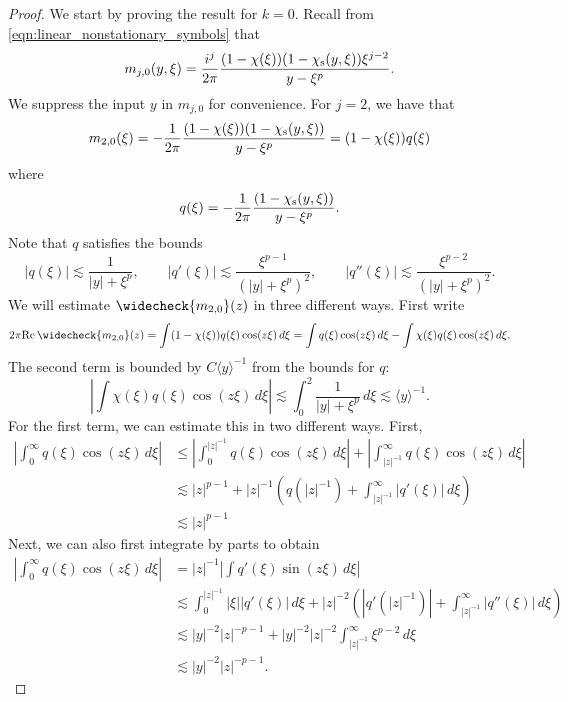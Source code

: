\documentclass[11pt]{amsart}
\theoremstyle{definition}
\theoremstyle{remark}
\numberwithin{equation}{section}
\newcommand{\ang}[1]{\langle #1 \rangle}
\begin{document}
\begin{proof}
    We start by proving the result for $k = 0$. Recall from \eqref{eqn:linear_nonstationary_symbols} that
    \[
        m_{j,0}(y,\xi)
        =\frac{i^j}{2\pi}
        \frac{(1-\chi(\xi))(1-\chi_{\textup{s}}(y,\xi))
        \xi^{j-2}}{y-\xi^p}.
    \]
    We suppress the input $y$ in $m_{j,0}$ for convenience. For $j = 2$, we have that
    \[m_{2,0}(\xi) = -\frac{1}{2\pi}\frac{(1-\chi(\xi))(1-\chi_{\textup{s}}(y,\xi))}{y-\xi^p} = (1 - \chi(\xi))q(\xi)\]
    where 
    \[q(\xi) = -\frac{1}{2\pi}\frac{(1-\chi_{\textup{s}}(y,\xi))}{y-\xi^p}.\]
    Note that $q$ satisfies the bounds 
    \[
    |q(\xi)|\lesssim\frac1{|y|+\xi^p},\qquad
    |q'(\xi)|\lesssim\frac{\xi^{p-1}}{(|y|+\xi^p)^2},\qquad
    |q''(\xi)|\lesssim\frac{\xi^{p-2}}{(|y|+\xi^p)^2}.
    \] 
    We will estimate $\widecheck{m_{2,0}}(z)$ in three different ways. First write
    \[2\pi\text{Re} \, \widecheck{m_{2,0}}(z) = \int (1 - \chi(\xi)) q(\xi) \cos(z\xi) \, d\xi = \int q(\xi) \cos(z\xi) \, d\xi - \int \chi(\xi) q(\xi) \cos(z\xi) \, d\xi.\]
    The second term is bounded by $C \ang{y}^{-1}$ from the bounds for $q$:
    \[\left|\int \chi(\xi) q(\xi) \cos(z\xi) \, d\xi\right| \lesssim \int_{0}^{2}\frac{1}{|y| + \xi^p} \, d\xi \lesssim \ang{y}^{-1}.\]
    For the first term, we can estimate this in two different ways. First,
    \begin{align*}
        \left|\int_{0}^{\infty} q(\xi) \cos(z\xi) \, d\xi\right| & \leq \left|\int_{0}^{|z|^{-1}} q(\xi) \cos(z\xi) \, d\xi\right| + \left|\int_{|z|^{-1}}^{\infty} q(\xi) \cos(z\xi) \, d\xi\right| \\
        & \lesssim |z|^{p - 1} + |z|^{-1}\left(q(|z|^{-1}) + \int_{|z|^{-1}}^{\infty} |q'(\xi)| \, d\xi\right) \\
        & \lesssim |z|^{p-1} 
    \end{align*}
    Next, we can also first integrate by parts to obtain
    \begin{align*}
         \left|\int_{0}^{\infty} q(\xi) \cos(z\xi) \, d\xi\right| & =  |z|^{-1} \left|\int q'(\xi) \sin(z\xi) \, d\xi\right| \\
         & \lesssim \int_{0}^{|z|^{-1}}|\xi||q'(\xi)| \, d\xi + |z|^{-2}\left( |q'(|z|^{-1})| + \int_{|z|^{-1}}^{\infty}|q''(\xi)| \, d\xi \right) \\
         & \lesssim |y|^{-2}|z|^{-p-1} + |y|^{-2}|z|^{-2}\int_{|z|^{-1}}^{\infty}\xi^{p-2} \, d\xi \\
         & \lesssim |y|^{-2}|z|^{-p-1}.
    \end{align*}

\end{proof}
\end{document}
